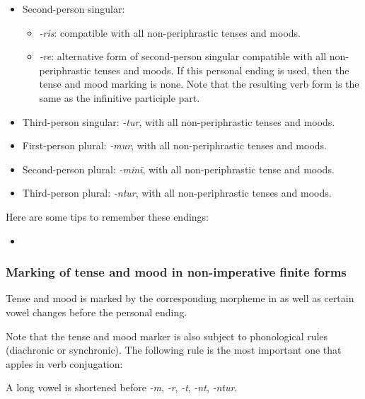 \documentclass{article}
\newcommand*{\corpus}[1]{\emph{#1}}
\begin{document}
\begin{itemize}
\begin{itemize}
        \item Second-person singular:
        \begin{itemize}
            \item \corpus{-ris}: compatible with all non-periphrastic tenses and moods.
            \item \corpus{-re}: alternative form of second-person singular compatible 
            with all non-periphrastic tenses and moods.
            If this personal ending is used, then the tense and mood marking is none.
            Note that the resulting verb form is the same as the infinitive participle part.
        \end{itemize}
        \item Third-person singular: \corpus{-tur}, with all non-periphrastic tenses and moods.
        \item First-person plural: \corpus{-mur}, with all non-periphrastic tenses and moods.
        \item Second-person plural: \corpus{-minī}, with all non-periphrastic tense and moods.
        \item Third-person plural: \corpus{-ntur}, with all non-periphrastic tenses and moods.
    \end{itemize}
\end{itemize}

Here are some tips to remember these endings:
\begin{itemize}
    \item 
\end{itemize}

\subsubsection{Marking of tense and mood in non-imperative finite forms}\label{sec:tense-mood-marking}

Tense and mood is marked by the corresponding morpheme in 
as well as certain vowel changes before the personal ending.

Note that the tense and mood marker is also subject to phonological rules %
(diachronic or synchronic).
The following rule is the most important one that apples in verb conjugation:
\begin{exe}
    \ex\label{ex:vowel-shortening} 
    A long vowel is shortened before \corpus{-m}, \corpus{-r}, \corpus{-t}, \corpus{-nt}, \corpus{-ntur}.
\end{exe}
\end{document}
